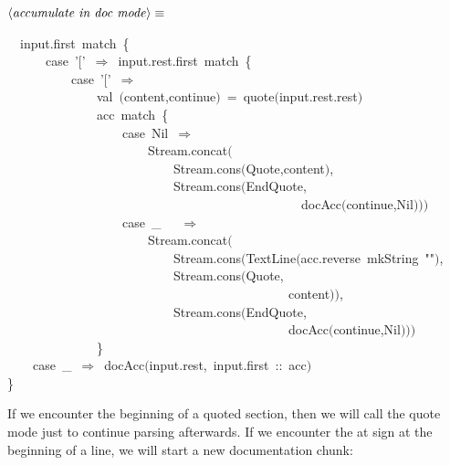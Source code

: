 \documentclass[a4paper,12pt]{article}
\begin{document}
$\left<\mbox{\emph{accumulate in doc mode}}\right>\equiv$
\begin{program}~~input.first~{\vem match}~{\small\{}
\\~~~~~~{\vem case}~'$[$'~$\Rightarrow$~input.rest.first~{\vem match}~{\small\{}
\\~~~~~~~~~~{\vem case}~'$[$'~$\Rightarrow$
\\~~~~~~~~~~~~~~{\vem val}~$($content,continue$)$~=~quote$($input.rest.rest$)$
\\~~~~~~~~~~~~~~acc~{\vem match}~{\small\{}
\\~~~~~~~~~~~~~~~~~~{\vem case}~Nil~$\Rightarrow$
\\~~~~~~~~~~~~~~~~~~~~~~Stream.concat$($
\\~~~~~~~~~~~~~~~~~~~~~~~~~~Stream.cons$($Quote,content$)$,
\\~~~~~~~~~~~~~~~~~~~~~~~~~~Stream.cons$($EndQuote,
\\~~~~~~~~~~~~~~~~~~~~~~~~~~~~~~~~~~~~~~~~~~~~~~docAcc$($continue,Nil$)$$)$$)$
\\~~~~~~~~~~~~~~~~~~{\vem case}~\_~~~$\Rightarrow$
\\~~~~~~~~~~~~~~~~~~~~~~Stream.concat$($
\\~~~~~~~~~~~~~~~~~~~~~~~~~~Stream.cons$($TextLine$($acc.reverse~mkString~""$)$,
\\~~~~~~~~~~~~~~~~~~~~~~~~~~Stream.cons$($Quote,
\\~~~~~~~~~~~~~~~~~~~~~~~~~~~~~~~~~~~~~~~~~~~~content$)$$)$,
\\~~~~~~~~~~~~~~~~~~~~~~~~~~Stream.cons$($EndQuote,
\\~~~~~~~~~~~~~~~~~~~~~~~~~~~~~~~~~~~~~~~~~~~~docAcc$($continue,Nil$)$$)$$)$
\\~~~~~~~~~~~~~~{\small\}}
\\~~~~{\vem case}~\_~$\Rightarrow$~docAcc$($input.rest,~input.first~{\rm :}{\rm :}~acc$)$
\\{\small\}}
\\[0.5em]\end{program}


If we encounter the beginning of a quoted section, then we will call
the quote mode just to continue parsing afterwards. If we encounter the
at sign at the beginning of a line, we will start a new documentation chunk:
\end{document}
